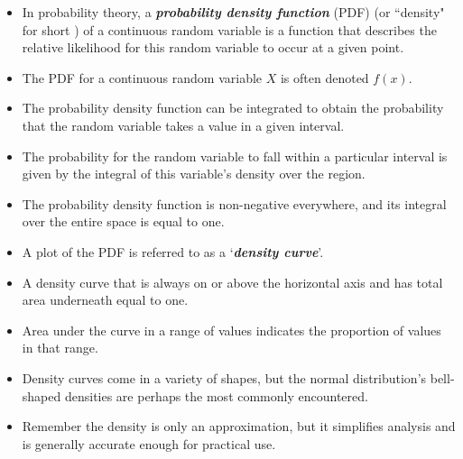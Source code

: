 \documentclass[12pt]{report}
\begin{document}
{\LARGE
	
	\begin{itemize}
		\item
		In probability theory, a \textbf{\emph{probability density function}} (PDF) (or ``density" for short ) of a continuous random variable is a function that describes the relative likelihood for this random variable to occur at a given point.
		
		\item The PDF for a continuous random variable $X$ is often denoted $f(x)$.
		
		\item The probability density function can be integrated to obtain the probability that the random variable takes a value in a given interval.
		
		\item The probability for the random variable to fall within a particular interval is given by the integral of this variable's density over the region.
		
		\item The probability density function is non-negative everywhere, and its integral over the entire space is equal to one.
	\end{itemize}
}




\begin{itemize}
	\item A plot of the PDF is referred to as a `\textbf{\emph{density curve}}'.
	\item A density curve that is always on or above the horizontal axis and has total area underneath equal to one.
	\item Area under the curve in a range of values indicates the proportion of values in that range.
	\item Density curves come in a variety of shapes, but the normal distribution's bell-shaped densities are perhaps the most commonly encountered.
	\item Remember the density is only an approximation, but it simplifies analysis and is generally accurate enough for practical use.
\end{itemize}
\end{document}
